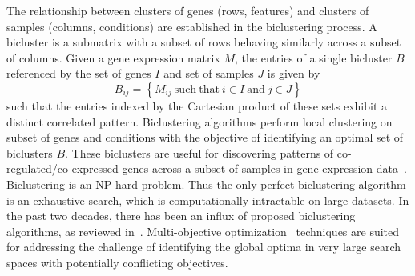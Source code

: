 The relationship between clusters of genes (rows, features) and clusters of samples (columns, conditions) are established in the biclustering process. A bicluster is a submatrix with a subset of rows behaving similarly across a subset of columns.
Given a gene expression matrix $M$, the entries of a single bicluster $B$ referenced by the set of genes $I$ and set of samples $J$ is given by
\begin{equation}
	B_{ij} = \left\{ M_{ij}\ \mathrm{such\ that}\ i\in I\ \mathrm{and}\ j\in J \right\}
\end{equation}
 such that the entries indexed by the Cartesian product of these sets exhibit a distinct correlated pattern.
Biclustering algorithms perform local clustering on subset of genes and conditions with the objective of identifying an optimal set of biclusters $B$. These biclusters are useful for discovering patterns of co-regulated/co-expressed genes across a subset of samples in gene expression data~\cite{pontes2015biclustering}.
Biclustering is an NP hard problem. Thus the only perfect biclustering algorithm is an exhaustive search, which is computationally intractable on large datasets.
In the past two decades, there has been an influx of proposed biclustering algorithms, as reviewed in~\cite{prelic2006systematic, eren2012comparative, oghabian2014biclustering, pontes2015biclustering, roy2016analysis}.
Multi-objective optimization~\cite{deb2014multi} techniques are suited for addressing the challenge of identifying the global optima in very large search spaces with potentially conflicting objectives. 

